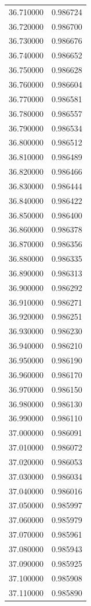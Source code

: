 \begin{tabular}{rr}
36.710000 & 0.986724 \\
36.720000 & 0.986700 \\
36.730000 & 0.986676 \\
36.740000 & 0.986652 \\
36.750000 & 0.986628 \\
36.760000 & 0.986604 \\
36.770000 & 0.986581 \\
36.780000 & 0.986557 \\
36.790000 & 0.986534 \\
36.800000 & 0.986512 \\
36.810000 & 0.986489 \\
36.820000 & 0.986466 \\
36.830000 & 0.986444 \\
36.840000 & 0.986422 \\
36.850000 & 0.986400 \\
36.860000 & 0.986378 \\
36.870000 & 0.986356 \\
36.880000 & 0.986335 \\
36.890000 & 0.986313 \\
36.900000 & 0.986292 \\
36.910000 & 0.986271 \\
36.920000 & 0.986251 \\
36.930000 & 0.986230 \\
36.940000 & 0.986210 \\
36.950000 & 0.986190 \\
36.960000 & 0.986170 \\
36.970000 & 0.986150 \\
36.980000 & 0.986130 \\
36.990000 & 0.986110 \\
37.000000 & 0.986091 \\
37.010000 & 0.986072 \\
37.020000 & 0.986053 \\
37.030000 & 0.986034 \\
37.040000 & 0.986016 \\
37.050000 & 0.985997 \\
37.060000 & 0.985979 \\
37.070000 & 0.985961 \\
37.080000 & 0.985943 \\
37.090000 & 0.985925 \\
37.100000 & 0.985908 \\
37.110000 & 0.985890 \\

\end{tabular}
